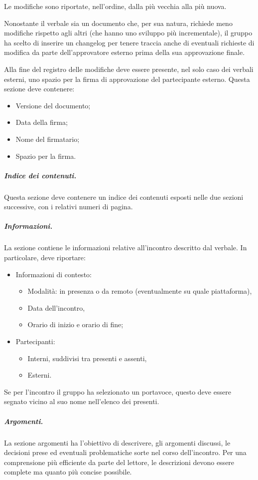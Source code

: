 Le modifiche sono riportate, nell'ordine, dalla più vecchia alla più nuova.
\par Nonostante il verbale sia un documento che, per sua natura, richiede meno modifiche rispetto agli altri (che hanno uno sviluppo più incrementale), il gruppo ha scelto di inserire un changelog per tenere traccia anche di eventuali richieste di modifica da parte dell'approvatore esterno prima della sua approvazione finale.
\par Alla fine del registro delle modifiche deve essere presente, nel solo caso dei verbali esterni, uno spazio per la firma di approvazione del partecipante esterno. Questa sezione deve contenere:
\begin{itemize}
    \item Versione del documento;
    \item Data della firma;
    \item Nome del firmatario;
    \item Spazio per la firma.
\end{itemize}
\subparagraph{Indice dei contenuti.}
Questa sezione deve contenere un indice dei contenuti esposti nelle due sezioni successive, con i relativi numeri di pagina.
\subparagraph{Informazioni.}
La sezione contiene le informazioni relative all'incontro descritto dal verbale. In particolare, deve riportare:
\begin{itemize}
    \item Informazioni di contesto:
    \begin{itemize}
        \item Modalità: in presenza o da remoto (eventualmente su quale piattaforma),
        \item Data dell'incontro,
        \item Orario di inizio e orario di fine;
    \end{itemize}
    \item Partecipanti:
    \begin{itemize}
        \item Interni, suddivisi tra presenti e assenti,
        \item Esterni.
    \end{itemize}
\end{itemize}
Se per l'incontro il gruppo ha selezionato un portavoce, questo deve essere segnato vicino al suo nome nell'elenco dei presenti.
\subparagraph{Argomenti.}
La sezione argomenti ha l'obiettivo di descrivere, gli argomenti discussi, le decisioni prese ed eventuali problematiche sorte nel corso dell'incontro. Per una comprensione più efficiente da parte del lettore, le descrizioni devono essere complete ma quanto più concise possibile.
